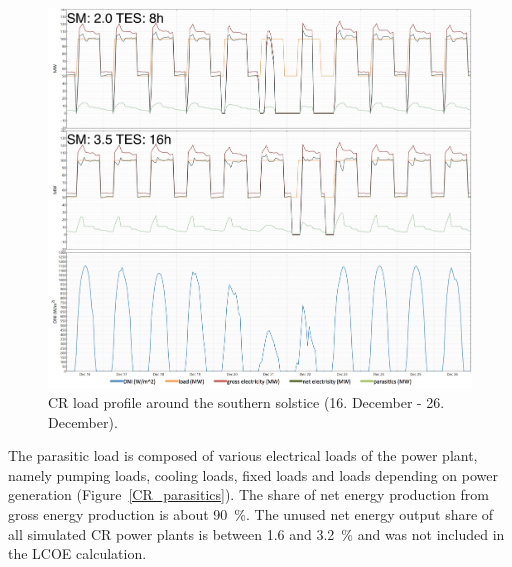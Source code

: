 \begin{figure}[htbp]  
\centering
\includegraphics[width=1\linewidth]{FIG/CR_summer_load}
\caption[CR load profile around the southern solstice.]{CR load profile around the southern solstice (16. December - 26. December).}\label{CR_summer_load}
\end{figure}

The parasitic load is composed of various electrical loads of the power plant, namely pumping loads, cooling loads, fixed loads and loads depending on power generation (Figure~\ref{CR_parasitics}). The share of net energy production from gross energy production is about \SI{90}{\percent}. The unused net energy output share of all simulated \ac{CR} power plants is between \num{1.6} and \SI{3.2}{\percent} and was not included in the \ac{LCOE} calculation.

